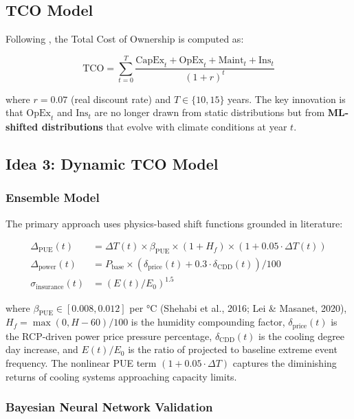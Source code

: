 \documentclass[12pt,a4paper]{article}
\begin{document}
\subsection{TCO Model}

Following \citet{dccore2025}, the Total Cost of Ownership is computed as:

\begin{equation}
\text{TCO} = \sum_{t=0}^{T} \frac{\text{CapEx}_t + \text{OpEx}_t + \text{Maint}_t + \text{Ins}_t}{(1+r)^t}
\end{equation}

where $r = 0.07$ (real discount rate) and $T \in \{10, 15\}$ years. The key innovation is that $\text{OpEx}_t$ and $\text{Ins}_t$ are no longer drawn from static distributions but from \textbf{ML-shifted distributions} that evolve with climate conditions at year $t$.

\subsection{Idea 3: Dynamic TCO Model}

\subsubsection{Ensemble Model}

The primary approach uses physics-based shift functions grounded in literature:

\begin{align}
\Delta_{\text{PUE}}(t) &= \Delta T(t) \times \beta_{\text{PUE}} \times (1 + H_f) \times (1 + 0.05 \cdot \Delta T(t)) \\
\Delta_{\text{power}}(t) &= P_{\text{base}} \times (\delta_{\text{price}}(t) + 0.3 \cdot \delta_{\text{CDD}}(t)) / 100 \\
\sigma_{\text{insurance}}(t) &= (E(t) / E_0)^{1.5}
\end{align}

where $\beta_{\text{PUE}} \in [0.008, 0.012]$ per °C (Shehabi et al., 2016; Lei \& Masanet, 2020), $H_f = \max(0, H - 60)/100$ is the humidity compounding factor, $\delta_{\text{price}}(t)$ is the RCP-driven power price pressure percentage, $\delta_{\text{CDD}}(t)$ is the cooling degree day increase, and $E(t)/E_0$ is the ratio of projected to baseline extreme event frequency. The nonlinear PUE term $(1 + 0.05 \cdot \Delta T)$ captures the diminishing returns of cooling systems approaching capacity limits.

\subsubsection{Bayesian Neural Network Validation}
\end{document}
